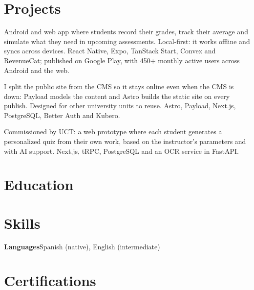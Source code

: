 \documentclass[english]{cv}
\begin{document}
\section{Projects}
Android and web app where students record their grades, track their
average and simulate what they need in upcoming assessments.
Local-first: it works offline and syncs across devices. React Native,
Expo, TanStack Start, Convex and RevenueCat; published on Google
Play, with 450+ monthly active users across Android and the web.

I split the public site from the CMS so it stays online even when the
CMS is down: Payload models the content and Astro builds the static
site on every publish. Designed for other university units to reuse.
Astro, Payload, Next.js, PostgreSQL, Better Auth and Kubero.

Commissioned by UCT: a web prototype where each student generates a
personalized quiz from their own work, based on the instructor's
parameters and with AI support. Next.js, tRPC, PostgreSQL and an OCR
service in FastAPI.

\section{Education}

\section{Skills}

\vspace{4pt}\noindent\textbf{Languages}\cvdot Spanish (native),
English (intermediate)

\section{Certifications}
\end{document}
